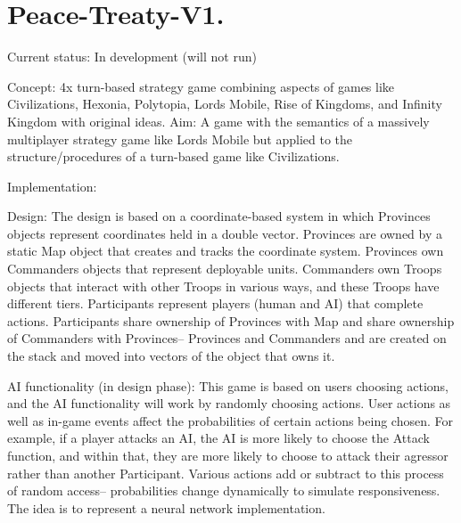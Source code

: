 \chapter{Peace-\/\+Treaty-\/\+V1. }
\hypertarget{md__r_e_a_d_m_e}{}\label{md__r_e_a_d_m_e}
\label{md__r_e_a_d_m_e_autotoc_md0}%
%


Current status:\+ In development (will not run)

Concept:\+ 4x turn-\/based strategy game combining aspects of games like Civilizations, Hexonia, Polytopia, Lords Mobile, Rise of Kingdoms, and Infinity Kingdom with original ideas. Aim:\+ A game with the semantics of a massively multiplayer strategy game like Lords Mobile but applied to the structure/\+procedures of a turn-\/based game like Civilizations.

Implementation:\+
\begin{DoxyItemize}
\item Design:\+ The design is based on a coordinate-\/based system in which Provinces objects represent coordinates held in a double vector. Provinces are owned by a static Map object that creates and tracks the coordinate system. Provinces own Commanders objects that represent deployable units. Commanders own Troops objects that interact with other Troops in various ways, and these Troops have different tiers. Participants represent players (human and AI) that complete actions. Participants share ownership of Provinces with Map and share ownership of Commanders with Provinces-- Provinces and Commanders and are created on the stack and moved into vectors of the object that owns it.
\item AI functionality (in design phase):\+ This game is based on users choosing actions, and the AI functionality will work by randomly choosing actions. User actions as well as in-\/game events affect the probabilities of certain actions being chosen. For example, if a player attacks an AI, the AI is more likely to choose the Attack function, and within that, they are more likely to choose to attack their agressor rather than another Participant. Various actions add or subtract to this process of random access-- probabilities change dynamically to simulate responsiveness. The idea is to represent a neural network implementation.
\end{DoxyItemize}


